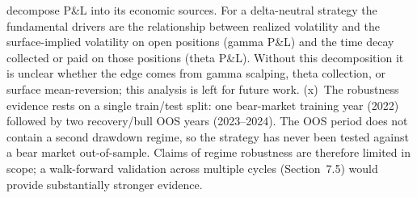 \documentclass[10pt,twocolumn]{article}
\begin{document}
decompose P\&L into its economic sources.  For a delta-neutral strategy the
fundamental drivers are the relationship between realized volatility and the
surface-implied volatility on open positions (gamma P\&L) and the time decay
collected or paid on those positions (theta P\&L).  Without this
decomposition it is unclear whether the edge comes from gamma scalping,
theta collection, or surface mean-reversion; this analysis is left for
future work.
(x)~The robustness evidence rests on a single train/test split: one
bear-market training year (2022) followed by two recovery/bull OOS years
(2023--2024).  The OOS period does not contain a second drawdown regime, so
the strategy has never been tested against a bear market out-of-sample.
Claims of regime robustness are therefore limited in scope; a walk-forward
validation across multiple cycles (Section~7.5) would provide substantially
stronger evidence.
\end{document}
